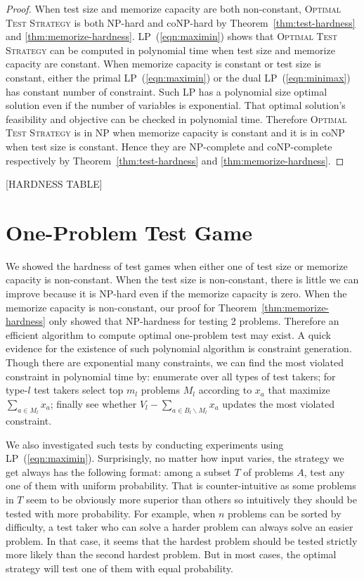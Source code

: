 \documentclass{article}
\begin{document}
\begin{proof}
When test size and memorize capacity are both non-constant, \textsc{Optimal
Test Strategy} is both NP-hard and coNP-hard by Theorem~\ref{thm:test-hardness}
and \ref{thm:memorize-hardness}.  LP~(\ref{eqn:maximin}) shows that
\textsc{Optimal Test Strategy} can be computed in polynomial time when test
size and memorize capacity are constant.  When memorize capacity is constant or
test size is constant, either the primal LP~(\ref{eqn:maximin}) or the dual
LP~(\ref{eqn:minimax}) has constant number of constraint. Such LP has a
polynomial size optimal solution even if the number of variables is
exponential. That optimal solution's feasibility and objective can be checked
in polynomial time. Therefore \textsc{Optimal Test Strategy} is in NP when
memorize capacity is constant and it is in coNP when test size is constant.
Hence they are NP-complete and coNP-complete respectively by
Theorem~\ref{thm:test-hardness} and \ref{thm:memorize-hardness}. 
\end{proof}

[HARDNESS TABLE]

\section{One-Problem Test Game}

We showed the hardness of test games when either one of test size or memorize
capacity is non-constant. When the test size is non-constant, there is little
we can improve because it is NP-hard even if the memorize capacity is zero.
When the memorize capacity is non-constant, our proof for
Theorem~\ref{thm:memorize-hardness} only showed that NP-hardness for testing 2
problems. Therefore an efficient algorithm to compute optimal one-problem test
may exist. A quick evidence for the existence of such polynomial algorithm is
constraint generation. Though there are exponential many constraints, we can
find the most violated constraint in polynomial time by: enumerate over all
types of test takers; for type-$l$ test takers  select top $m_l$ problems $M_l$
according to $x_a$ that maximize $\sum_{a \in M_l} x_a$; finally see whether
$V_l - \sum_{a \in B_l \backslash M_l} x_a$ updates the most violated
constraint.

We also investigated such tests by conducting experiments using
LP~(\ref{eqn:maximin}). Surprisingly, no matter how input varies, the strategy
we get always has the following format: among a subset $T$ of problems $A$,
test any one of them with uniform probability. That is counter-intuitive as
some problems in $T$ seem to be obviously more superior than others so
intuitively they should be tested with more probability. For example, when $n$
problems can be sorted by difficulty, a test taker who can solve a harder
problem can always solve an easier problem. In that case, it seems that the
hardest problem should be tested strictly more likely than the second hardest
problem. But in most cases, the optimal strategy will test one of them with
equal probability.
\end{document}

